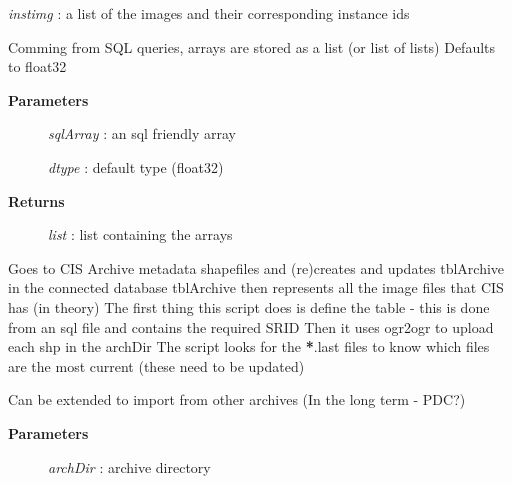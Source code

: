 \documentclass[letterpaper,10pt,english]{sphinxmanual}
\begin{document}
\begin{fulllineitems}
\begin{fulllineitems}
\begin{description}
\emph{instimg}   :   a list of the images and their corresponding instance ids

\end{description}

\end{fulllineitems}


\begin{fulllineitems}
\label{code:Database.Database.sql2numpy}
Comming from SQL queries, arrays are stored as a list (or list of lists)
Defaults to float32
\begin{description}
\item[{\textbf{Parameters}}] \leavevmode
\emph{sqlArray}  : an sql friendly array

\emph{dtype} :   default type (float32)

\item[{\textbf{Returns}}] \leavevmode
\emph{list}  :   list containing the arrays

\end{description}

\end{fulllineitems}


\begin{fulllineitems}
\label{code:Database.Database.updateFromArchive}
Goes to CIS Archive metadata shapefiles and (re)creates and updates tblArchive in the connected database
tblArchive then represents all the image files that CIS has (in theory)
The first thing this script does is define the table - this is done from an sql file and contains the required SRID
Then it uses ogr2ogr to upload each shp in the archDir 
The script looks for the {\color{red}\bfseries{}*}.last files to know which files are the most current (these need to be updated)

Can be extended to import from other archives (In the long term - PDC?)
\begin{description}
\item[{\textbf{Parameters}}] \leavevmode
\emph{archDir}   : archive directory

\end{description}

\end{fulllineitems}


\end{fulllineitems}
\end{document}
